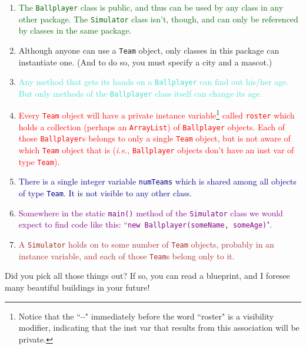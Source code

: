 \begin{enumerate}
\itemsep.1em

\item \textcolor{darkgreen}{The \texttt{Ballplayer} class is public, and thus
can be used by any class in any other package. The \texttt{Simulator} class
isn't, though, and can only be referenced by classes in the same package.}

\item \textcolor{BurntOrange}{Although anyone can use a \texttt{Team} object,
only classes in this package can instantiate one. (And to do so, you must
specify a city and a mascot.)} 

\item \textcolor{Turquoise}{Any method that gets its hands on a
\texttt{Ballplayer} can find out his/her age. But only methods of the
\texttt{Ballplayer} class itself can change its age.}

\item \textcolor{Red}{Every \texttt{Team} object will have a private instance
variable\footnote{Notice that the ``\textbf{--}" immediately before the word
``roster" is a visibility modifier, indicating that the inst var that results
from this association will be private.} called \texttt{roster} which holds a collection (perhaps an
\texttt{ArrayList}) of \texttt{Ballplayer} objects. Each of those
\texttt{Ballplayer}s belongs to only a single \texttt{Team} object, but is not
aware of which \texttt{Team} object that is (\textit{i.e.},
\texttt{Ballplayer} objects don't have an inst var of type \texttt{Team})}.

\item \textcolor{darkblue}{There is a single integer variable \texttt{numTeams}
which is shared among all objects of type \texttt{Team}. It is not visible to
any other class.}

\item \textcolor{Purple}{Somewhere in the static \texttt{main()} method of the
\texttt{Simulator} class we would expect to find code like this: ``\texttt{new
Ballplayer(someName, someAge)}".}

\item \textcolor{Brown}{A \texttt{Simulator} holds on to some number of
\texttt{Team} objects, probably in an instance variable, and each of those
\texttt{Team}s belong only to it.}

\end{enumerate}

Did you pick all those things out? If so, you can read a blueprint, and I
foresee many beautiful buildings in your future!

